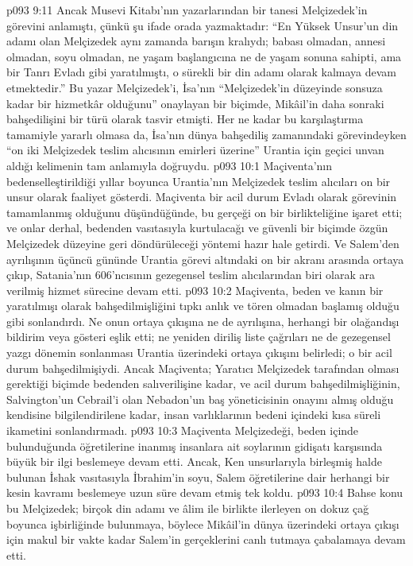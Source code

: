\vs p093 9:11 Ancak Musevi Kitabı’nın yazarlarından bir tanesi Melçizedek’in görevini anlamıştı, çünkü şu ifade orada yazmaktadır: “En Yüksek Unsur’un din adamı olan Melçizedek aynı zamanda barışın kralıydı; babası olmadan, annesi olmadan, soyu olmadan, ne yaşam başlangıcına ne de yaşam sonuna sahipti, ama bir Tanrı Evladı gibi yaratılmıştı, o sürekli bir din adamı olarak kalmaya devam etmektedir.” Bu yazar Melçizedek’i, İsa’nın “Melçizedek’in düzeyinde sonsuza kadar bir hizmetkâr olduğunu” onaylayan bir biçimde, Mikâil’in daha sonraki bahşedilişini bir türü olarak tasvir etmişti. Her ne kadar bu karşılaştırma tamamiyle yararlı olmasa da, İsa’nın dünya bahşediliş zamanındaki görevindeyken “on iki Melçizedek teslim alıcısının emirleri üzerine” Urantia için geçici unvan aldığı kelimenin tam anlamıyla doğruydu.
\vs p093 10:1 Maçiventa’nın bedenselleştirildiği yıllar boyunca Urantia’nın Melçizedek teslim alıcıları on bir unsur olarak faaliyet gösterdi. Maçiventa bir acil durum Evladı olarak görevinin tamamlanmış olduğunu düşündüğünde, bu gerçeği on bir birlikteliğine işaret etti; ve onlar derhal, bedenden vasıtasıyla kurtulacağı ve güvenli bir biçimde özgün Melçizedek düzeyine geri döndürüleceği yöntemi hazır hale getirdi. Ve Salem’den ayrılışının üçüncü gününde Urantia görevi altındaki on bir akranı arasında ortaya çıkıp, Satania’nın 606’ncısının gezegensel teslim alıcılarından biri olarak ara verilmiş hizmet sürecine devam etti.
\vs p093 10:2 Maçiventa, beden ve kanın bir yaratılmışı olarak bahşedilmişliğini tıpkı anlık ve tören olmadan başlamış olduğu gibi sonlandırdı. Ne onun ortaya çıkışına ne de ayrılışına, herhangi bir olağandışı bildirim veya gösteri eşlik etti; ne yeniden diriliş liste çağrıları ne de gezegensel yazgı dönemin sonlanması Urantia üzerindeki ortaya çıkışını belirledi; o bir acil durum bahşedilmişiydi. Ancak Maçiventa; Yaratıcı Melçizedek tarafından olması gerektiği biçimde bedenden salıverilişine kadar, ve acil durum bahşedilmişliğinin, Salvington’un Cebrail’i olan Nebadon’un baş yöneticisinin onayını almış olduğu kendisine bilgilendirilene kadar, insan varlıklarının bedeni içindeki kısa süreli ikametini sonlandırmadı.
\vs p093 10:3 Maçiventa Melçizedeği, beden içinde bulunduğunda öğretilerine inanmış insanlara ait soylarının gidişatı karşısında büyük bir ilgi beslemeye devam etti. Ancak, Ken unsurlarıyla birleşmiş halde bulunan İshak vasıtasıyla İbrahim’in soyu, Salem öğretilerine dair herhangi bir kesin kavramı beslemeye uzun süre devam etmiş tek koldu.
\vs p093 10:4 Bahse konu bu Melçizedek; birçok din adamı ve âlim ile birlikte ilerleyen on dokuz çağ boyunca işbirliğinde bulunmaya, böylece Mikâil’in dünya üzerindeki ortaya çıkışı için makul bir vakte kadar Salem’in gerçeklerini canlı tutmaya çabalamaya devam etti.
